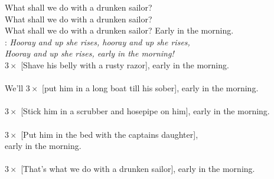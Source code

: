 
What shall we do with a drunken sailor?\\
What shall we do with a drunken sailor?\\
What shall we do with a drunken sailor? Early  in the morning.\\

\textregistered:
\emph{Hooray and up she rises, hooray and up she rises,\\
Hooray and up she rises, early in the morning!}\\

$3\times$ [Shave his belly with a rusty razor], early in the morning.\\

\textregistered\\

We'll $3\times$ [put him in a long boat till his sober], early in the morning.\\

\textregistered\\

$3\times$ [Stick him in a scrubber and hosepipe on him], early in the morning.\\

\textregistered\\

$3\times$ [Put him in the bed with the captains daughter],\\
early in the morning.\\

\textregistered\\

$3\times$ [That’s what we do with a drunken sailor], early in the morning.\\

\textregistered \textregistered

\newpage
